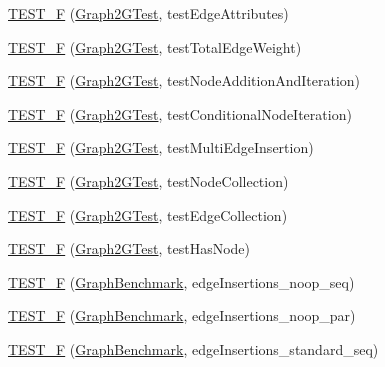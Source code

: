 \begin{DoxyCompactItemize}
\item 
\hyperlink{namespace_networ_kit_a0168a4bed98948b1fa07d617dd5585bb}{T\-E\-S\-T\-\_\-\-F} (\hyperlink{class_networ_kit_1_1_graph2_g_test}{Graph2\-G\-Test}, test\-Edge\-Attributes)
\item 
\hyperlink{namespace_networ_kit_ad517c068acc59ed40d4236c225ab942a}{T\-E\-S\-T\-\_\-\-F} (\hyperlink{class_networ_kit_1_1_graph2_g_test}{Graph2\-G\-Test}, test\-Total\-Edge\-Weight)
\item 
\hyperlink{namespace_networ_kit_a787853c1596e3c8a1fab436c83e90540}{T\-E\-S\-T\-\_\-\-F} (\hyperlink{class_networ_kit_1_1_graph2_g_test}{Graph2\-G\-Test}, test\-Node\-Addition\-And\-Iteration)
\item 
\hyperlink{namespace_networ_kit_ab1d20804f18044f8ff75f0a71f6166ce}{T\-E\-S\-T\-\_\-\-F} (\hyperlink{class_networ_kit_1_1_graph2_g_test}{Graph2\-G\-Test}, test\-Conditional\-Node\-Iteration)
\item 
\hyperlink{namespace_networ_kit_a8583e118b4755375176da2b3dcf62f57}{T\-E\-S\-T\-\_\-\-F} (\hyperlink{class_networ_kit_1_1_graph2_g_test}{Graph2\-G\-Test}, test\-Multi\-Edge\-Insertion)
\item 
\hyperlink{namespace_networ_kit_a49cbaef2e44bd7f50e54f6e0ff886acd}{T\-E\-S\-T\-\_\-\-F} (\hyperlink{class_networ_kit_1_1_graph2_g_test}{Graph2\-G\-Test}, test\-Node\-Collection)
\item 
\hyperlink{namespace_networ_kit_aec973589c660504b61bd7c1ef5b60890}{T\-E\-S\-T\-\_\-\-F} (\hyperlink{class_networ_kit_1_1_graph2_g_test}{Graph2\-G\-Test}, test\-Edge\-Collection)
\item 
\hyperlink{namespace_networ_kit_a82e27df21fe7f3165c00d03e0083396d}{T\-E\-S\-T\-\_\-\-F} (\hyperlink{class_networ_kit_1_1_graph2_g_test}{Graph2\-G\-Test}, test\-Has\-Node)
\item 
\hyperlink{namespace_networ_kit_ab3677f34b5d4ea16d7d6cf26b1917959}{T\-E\-S\-T\-\_\-\-F} (\hyperlink{class_networ_kit_1_1_graph_benchmark}{Graph\-Benchmark}, edge\-Insertions\-\_\-noop\-\_\-seq)
\item 
\hyperlink{namespace_networ_kit_a63f18361fab3ad91fc3c71f32497050b}{T\-E\-S\-T\-\_\-\-F} (\hyperlink{class_networ_kit_1_1_graph_benchmark}{Graph\-Benchmark}, edge\-Insertions\-\_\-noop\-\_\-par)
\item 
\hyperlink{namespace_networ_kit_a8c65560bd7dca56d87f0f6fb4711e380}{T\-E\-S\-T\-\_\-\-F} (\hyperlink{class_networ_kit_1_1_graph_benchmark}{Graph\-Benchmark}, edge\-Insertions\-\_\-standard\-\_\-seq)
\item 

\end{DoxyCompactItemize}
